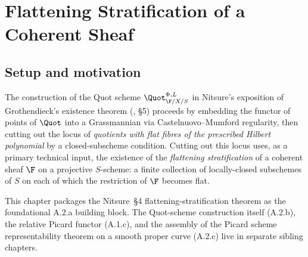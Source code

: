 \chapter{Flattening Stratification of a Coherent Sheaf}
\label{chap:Picard_FlatteningStratification}

%

\section{Setup and motivation}
\label{sec:flatstrat_setup}

The construction of the Quot scheme \(\Quot_{\F/X/S}^{\Phi,L}\) in Nitsure's exposition
of Grothendieck's existence theorem (\cite{nitsure-hilbert-quot}, \S5) proceeds by
embedding the functor of points of \(\Quot\) into a Grassmannian via Castelnuovo--Mumford
regularity, then cutting out the locus of \emph{quotients with flat fibres of the
prescribed Hilbert polynomial} by a closed-subscheme condition.  Cutting out this
locus uses, as a primary technical input, the existence of the
\emph{flattening stratification} of a coherent sheaf \(\F\) on a projective
\(S\)-scheme: a finite collection of locally-closed subschemes of \(S\) on each of which
the restriction of \(\F\) becomes flat.

This chapter packages the Nitsure~\S4 flattening-stratification theorem as the
foundational A.2.a building block. The Quot-scheme construction itself (A.2.b),
the relative Picard functor (A.1.c), and the assembly of the Picard scheme
representability theorem on a smooth proper curve (A.2.c) live in separate sibling
chapters.

